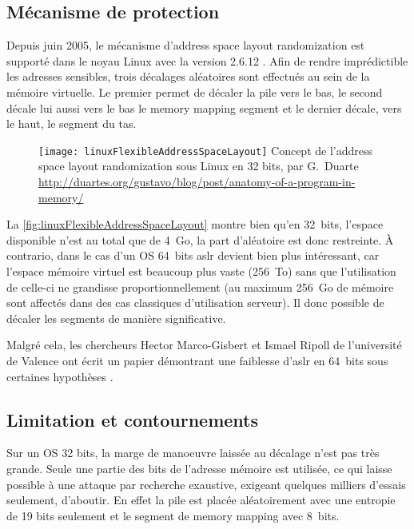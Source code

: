\subsection{Mécanisme de protection}

Depuis juin 2005, le mécanisme d'\og address space layout randomization \fg est supporté dans le noyau Linux avec la version 2.6.12 \cite{AddressSpaceLayoutRandomizationFR, AddressSpaceLayoutRandomizationEN}. Afin de rendre imprédictible les adresses sensibles, trois décalages aléatoires sont effectués au sein de la mémoire virtuelle. Le premier permet de décaler la pile vers le bas, le second décale lui aussi vers le bas le \og memory mapping segment \fg et le dernier décale, vers le haut, le segment du tas.

\begin{figure}[H]
	\centering
	\texttt{[image: linuxFlexibleAddressSpaceLayout]}
	{Concept de l'address space layout randomization sous Linux en 32 bits, par G.~Duarte}
	{\url{http://duartes.org/gustavo/blog/post/anatomy-of-a-program-in-memory/}}
	\label{fig:linuxFlexibleAddressSpaceLayout}
\end{figure}

La \autoref{fig:linuxFlexibleAddressSpaceLayout} montre bien qu'en 32~bits, l'espace disponible n'est au total que de 4~Go, la part d'aléatoire est donc restreinte. À contrario, dans le cas d'un OS 64~bits \gls{aslr} devient bien plus intéressant, car l'espace mémoire virtuel est beaucoup plus vaste (256~To) sans que l'utilisation de celle-ci ne grandisse proportionnellement (au maximum 256~Go de mémoire sont affectés dans des cas classiques d'utilisation serveur). Il donc possible de décaler les segments de manière significative.

Malgré cela, les chercheurs Hector Marco-Gisbert et Ismael Ripoll de l'université de Valence ont écrit un papier démontrant une faiblesse d'\gls{aslr} en 64~bits sous certaines hypothèses \cite{EffectivenessFullASLR64bit}.

\subsection{Limitation et contournements}

Sur un OS 32 bits, la marge de manoeuvre laissée au décalage n'est pas très grande. Seule une partie des bits de l'adresse mémoire est utilisée, ce qui laisse possible à une attaque par recherche exaustive, exigeant quelques milliers d'essais seulement, d'aboutir. En effet la pile est placée aléatoirement avec une entropie de 19 bits seulement et le segment de \og memory mapping \fg avec 8~bits.

